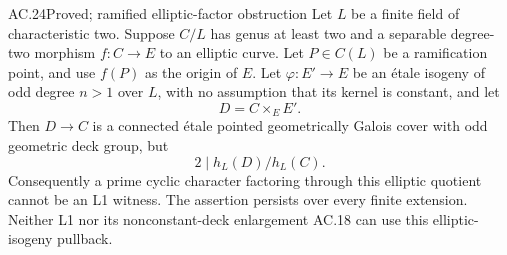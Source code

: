 \begin{claim}{AC.24}{Proved; ramified elliptic-factor obstruction}
Let $L$ be a finite field of characteristic two.  Suppose $C/L$ has
genus at least two and a separable degree-two morphism
$f:C\to E$ to an elliptic curve.  Let $P\in C(L)$ be a ramification
point, and use $f(P)$ as the origin of $E$.
Let $\varphi:E'\to E$ be an \'etale isogeny of odd degree $n>1$
over $L$, with no assumption that its kernel is constant, and let
\[
                         D=C\times_E E'.
\]
Then $D\to C$ is a connected \'etale pointed geometrically Galois
cover with odd geometric deck group, but
\[
                            2\mid h_L(D)/h_L(C).
\]
Consequently a prime cyclic character factoring through this elliptic
quotient cannot be an L1 witness.  The assertion persists over every
finite extension.  Neither L1 nor its nonconstant-deck enlargement
AC.18 can use this elliptic-isogeny pullback.
\end{claim}
